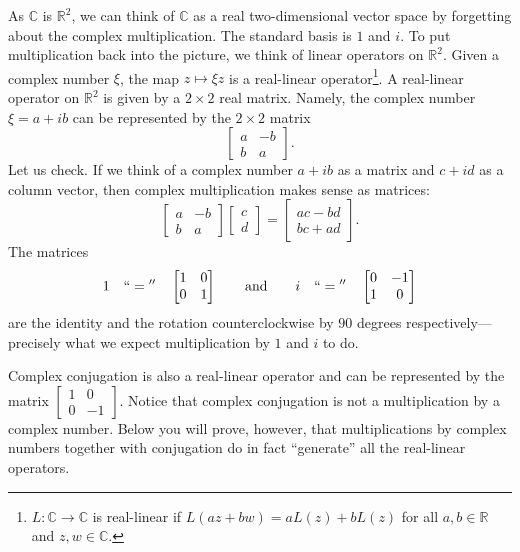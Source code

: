 \documentclass[12pt,openany]{book}
\newcommand{\C}{{\mathbb{C}}}
\newcommand{\R}{{\mathbb{R}}}
\newcommand{\myquote}[1]{``#1''}
\theoremstyle{plain}
\theoremstyle{remark}
\theoremstyle{definition}
\theoremstyle{exercise}
\theoremstyle{example}
\begin{document}
As $\C$ is $\R^2$, we can think of
$\C$ as a real two-dimensional vector space by forgetting about the
complex multiplication.  The standard basis is $1$ and $i$.
To put multiplication back into the picture, we think of linear operators
on $\R^2$.
Given a complex number $\xi$, the map $z \mapsto  \xi z$ is a
real-linear operator\footnote{$L \colon \C \to \C$ is real-linear if
$L(a z + b w) = aL(z)+bL(z)$ for all $a,b \in \R$ and $z,w \in \C$.}.
A real-linear operator on $\R^2$ is given by a $2 \times 2$ real
matrix.
Namely, the complex number $\xi = a+ib$ can be represented by the $2 \times 2$ matrix
\begin{equation} \label{eq:complexnumbermatrix}
\begin{bmatrix}
a & -b \\
b & a
\end{bmatrix} .
\end{equation}
Let us check.
If we think of a complex number $a+ib$ as a matrix
and $c+id$ as a column vector,
then complex multiplication makes sense as matrices:
\begin{equation*}
\begin{bmatrix}
a & -b \\
b & a
\end{bmatrix}
\begin{bmatrix}
c \\
d 
\end{bmatrix}
=
\begin{bmatrix}
ac-bd \\
bc+ad
\end{bmatrix} .
\end{equation*}
The matrices
\begin{equation*}
1 \quad ``{}={}'' \quad
\begin{bmatrix}
1 & 0 \\
0 & 1
\end{bmatrix} \qquad \text{and} \qquad
i \quad ``{}={}'' \quad
\begin{bmatrix}
0 & -1 \\
1 & 0
\end{bmatrix} 
\end{equation*}
are the identity and the rotation counterclockwise by $90$ degrees
respectively---precisely what we expect multiplication by $1$ and $i$
to do.

Complex conjugation is also a real-linear
operator and can be represented by the matrix $\left[ \begin{smallmatrix} 1 & 0 \\ 0 &
-1 \end{smallmatrix} \right]$.  Notice that complex conjugation is
not a multiplication by a complex number.
Below you will prove, however,
that multiplications by complex numbers together with conjugation do 
in fact \myquote{generate} all the real-linear operators.
\end{document}
